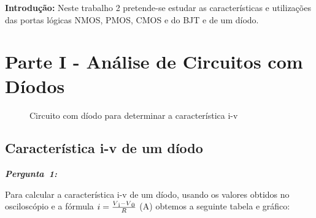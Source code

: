 \documentclass[pdftex,12pt,a4paper]{report}
\begin{document}
\renewcommand{\headrulewidth}{0pt}

\vspace*{\fill}
\textbf{Introdução:}
\begingroup
Neste trabalho 2 pretende-se estudar as características e utilizações das portas lógicas NMOS, PMOS, CMOS e do BJT e de um díodo.
\endgroup
\vspace*{\fill}
\newpage

\renewcommand*\contentsname{Conteúdos}
\renewcommand*\figurename{Figura}
\renewcommand*\tablename{Tabela}

\tableofcontents
\renewcommand{\headrulewidth}{0.15pt}
\renewcommand{\thechapter}{}

\clearpage

\section{Parte I - Análise de Circuitos com Díodos}
\begin{figure}[h]
\centerline{}
\caption{Circuito com díodo para determinar a característica i-v}\label{diodo_parte1}
\end{figure}

\subsection{Característica i-v de um díodo}
\hbox{\emph{\textbf{Pergunta 1:}}\newline\newline}

Para calcular a característica i-v de um díodo, usando os valores obtidos no osciloscópio e a fórmula $i = \frac{V\textsubscript{i}-V\textsubscript{0}}{R}$ (A) obtemos a seguinte tabela e gráfico:\newline

\endminipage\hfill
{}
\endminipage\hfill
\end{document}
